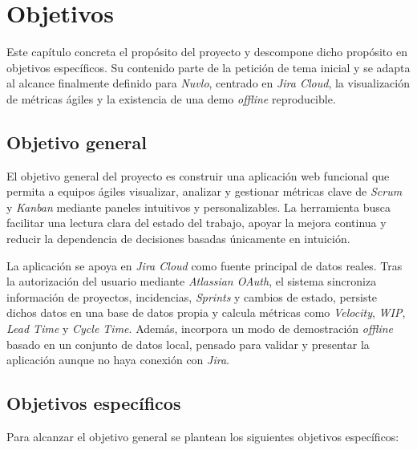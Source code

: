 \chapter{Objetivos}
\label{objetivos}

Este capítulo concreta el propósito del proyecto y descompone dicho propósito en objetivos específicos. Su contenido parte de la petición de tema inicial y se adapta al alcance finalmente definido para \textit{Nuvlo}, centrado en \textit{Jira Cloud}, la visualización de métricas ágiles y la existencia de una demo \textit{offline} reproducible.

\section{Objetivo general}

El objetivo general del proyecto es construir una aplicación web funcional que permita a equipos ágiles visualizar, analizar y gestionar métricas clave de \textit{Scrum} y \textit{Kanban} mediante paneles intuitivos y personalizables. La herramienta busca facilitar una lectura clara del estado del trabajo, apoyar la mejora continua y reducir la dependencia de decisiones basadas únicamente en intuición.

La aplicación se apoya en \textit{Jira Cloud} como fuente principal de datos reales. Tras la autorización del usuario mediante \textit{Atlassian OAuth}, el sistema sincroniza información de proyectos, incidencias, \textit{Sprints} y cambios de estado, persiste dichos datos en una base de datos propia y calcula métricas como \textit{Velocity}, \textit{WIP}, \textit{Lead Time} y \textit{Cycle Time}. Además, incorpora un modo de demostración \textit{offline} basado en un conjunto de datos local, pensado para validar y presentar la aplicación aunque no haya conexión con \textit{Jira}.

\section{Objetivos específicos}

Para alcanzar el objetivo general se plantean los siguientes objetivos específicos:

